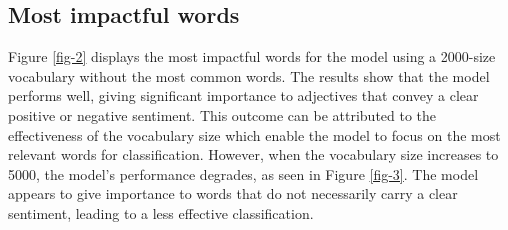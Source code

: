 \documentclass[eng]{class}
\begin{document}
\subsection{Most impactful words}
Figure \ref{fig-2} displays the most impactful words for the model using a 2000-size vocabulary without the most common words.
The results show that the model performs well, giving significant importance to adjectives that convey a clear positive or negative sentiment.
This outcome can be attributed to the effectiveness of the vocabulary size which enable the model to focus on the most relevant words for classification.
However, when the vocabulary size increases to 5000, the model's performance degrades, as seen in Figure \ref{fig-3}.
The model appears to give importance to words that do not necessarily carry a clear sentiment, leading to a less effective classification.
\end{document}
